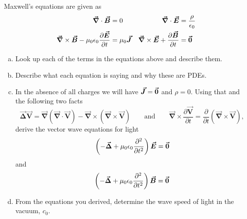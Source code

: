 \documentclass[12pt]{article} %
\newcommand{\grad}{\boldsymbol{\vec{\nabla}}}
\newcommand{\vecfieldE}{\boldsymbol{\vec{E}}}
\newcommand{\vecfieldB}{\boldsymbol{\vec{B}}}
\newcommand{\vecfieldJ}{\boldsymbol{\vec{J}}}
\newcommand{\veclaplace}{\boldsymbol{\vec{\Delta}}}
\newcommand{\vecfieldV}{\boldsymbol{\vec{V}}}
\begin{document}
\newpage
\begin{problem}
Maxwell's equations are given as
\begin{align*}
\grad \cdot \vecfieldB &= 0  & \grad \cdot \vecfieldE &= \frac{\rho}{\epsilon_0}\\
\grad \times \vecfieldB -\mu_0 \epsilon_0\frac{\partial \vecfieldE}{\partial t}&=\mu_0 \vecfieldJ & \grad \times \vecfieldE + \frac{\partial \vecfieldB}{\partial t} &= \zerovec
\end{align*}
\begin{enumerate}[(a)]
    \item Look up each of the terms in the equations above and describe them.
    \item Describe what each equation is saying and why these are PDEs.
    \item In the absence of all charges we will have $\vecfieldJ=\zerovec$ and $\rho=0$.  Using that and the following two facts
    \[
    \veclaplace \vecfieldV = \grad (\grad \cdot \vecfieldV) - \grad \times (\grad \times \vecfieldV) \qquad \textrm{and} \qquad \grad \times \frac{\partial \vecfieldV}{\partial t} = \frac{\partial}{\partial t} (\grad \times \vecfieldV),
    \]
    derive the vector wave equations for light
    \[
    \left( - \veclaplace + \mu_0 \epsilon_0 \frac{\partial^2 }{\partial t^2}\right) \vecfieldE = \zerovec
    \]
    and
    \[
    \left( - \veclaplace + \mu_0 \epsilon_0 \frac{\partial^2 }{\partial t^2}\right) \vecfieldB = \zerovec
    \]
    \item From the equations you derived, determine the wave speed of light in the vacuum, $c_0$.
\end{enumerate}
\end{problem}
\end{document}
